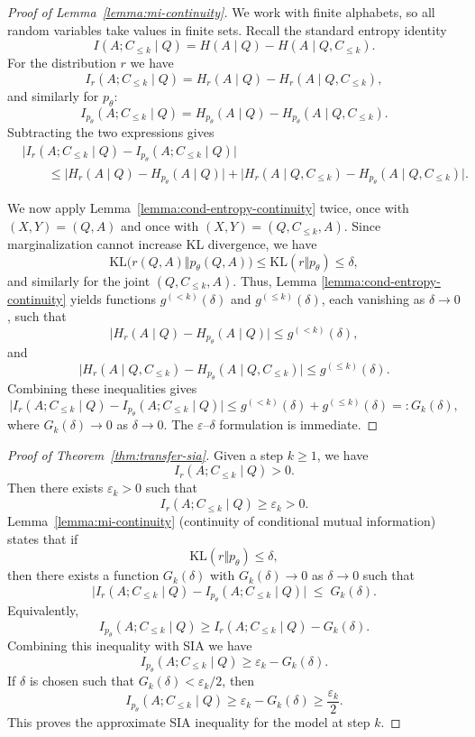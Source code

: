 \documentclass{article}
\begin{document}
\begin{proof}[Proof of Lemma~\ref{lemma:mi-continuity}]
We work with finite alphabets, so all random variables take values in finite sets. Recall the standard entropy identity
\[
I(A; C_{\le k} \mid Q)
=
H(A \mid Q)
-
H(A \mid Q, C_{\le k}).
\]
For the distribution $r$ we have
\[
I_r(A; C_{\le k} \mid Q)
=
H_r(A \mid Q)
-
H_r(A \mid Q, C_{\le k}),
\]
and similarly for $p_\theta$:
\[
I_{p_\theta}(A; C_{\le k} \mid Q)
=
H_{p_\theta}(A \mid Q)
-
H_{p_\theta}(A \mid Q, C_{\le k}).
\]
Subtracting the two expressions gives
\begin{align*}
&\bigl|
I_r(A; C_{\le k} \mid Q)
-
I_{p_\theta}(A; C_{\le k} \mid Q)
\bigr| \\
&\qquad\le
\bigl|
H_r(A \mid Q)
-
H_{p_\theta}(A \mid Q)
\bigr|
+
\bigl|
H_r(A \mid Q, C_{\le k})
-
H_{p_\theta}(A \mid Q, C_{\le k})
\bigr|.
\end{align*}

We now apply Lemma~\ref{lemma:cond-entropy-continuity} twice, once
with $(X,Y) = (Q,A)$ and once with $(X,Y) = (Q,C_{\le k},A)$. Since marginalization cannot increase KL divergence, we have
\[
\mathrm{KL}\bigl(r(Q,A)
\Vert
p_\theta(Q,A)
\bigr)
\le \mathrm{KL}(r\Vert p_\theta)
\le \delta,
\]
and similarly for the joint $(Q,C_{\le k},A)$. Thus, Lemma
\ref{lemma:cond-entropy-continuity} yields functions
$g^{(<k)}(\delta)$ and $g^{(\le k)}(\delta)$, each vanishing as
$\delta\to 0$, such that
\[
\bigl|
H_r(A \mid Q)
-
H_{p_\theta}(A \mid Q)
\bigr|
\le g^{(<k)}(\delta),
\]
and
\[
\bigl|
H_r(A \mid Q, C_{\le k})
-
H_{p_\theta}(A \mid Q, C_{\le k})
\bigr|
\le g^{(\le k)}(\delta).
\]
Combining these inequalities gives
\[
\bigl|
I_r(A; C_{\le k} \mid Q)
-
I_{p_\theta}(A; C_{\le k} \mid Q)
\bigr|
\le
g^{(<k)}(\delta) + g^{(\le k)}(\delta)
=: G_k(\delta),
\]
where $G_k(\delta)\to 0$ as $\delta\to 0$. The
$\varepsilon$--$\delta$ formulation is immediate.
\end{proof}

\begin{proof}[Proof of Theorem~\ref{thm:transfer-sia}]
Given a step $k \geq 1$, we have
\[
I_r(A; C_{\leq k} \mid Q) > 0.
\]
Then there exists $\varepsilon_k > 0$ such that
\[
I_r(A; C_{\leq k} \mid Q) \ge \varepsilon_k > 0.
\]
Lemma~\ref{lemma:mi-continuity} (continuity of conditional mutual information) states that if 
\[
\mathrm{KL}(r \Vert p_\theta) \le \delta,
\]
then there exists a function $G_k(\delta)$ with $G_k(\delta) \to 0$ as $\delta \to 0$ such that
\[
\bigl| I_r(A; C_{\le k} \mid Q) - I_{p_\theta}(A; C_{\le k} \mid Q) \bigr|
\;\le\; G_k(\delta).
\]
Equivalently,
\[
I_{p_\theta}(A; C_{\le k} \mid Q)
\ge I_r(A; C_{\le k} \mid Q) - G_k(\delta).
\]
Combining this inequality with SIA we have
\[
I_{p_\theta}(A; C_{\le k} \mid Q)
\ge \varepsilon_k - G_k(\delta).
\]
If $\delta$ is chosen such that $G_k(\delta) < \varepsilon_k/2$, then
\[
I_{p_\theta}(A; C_{\le k} \mid Q)
\ge \varepsilon_k - G_k(\delta)
\ge \frac{\varepsilon_k}{2}.
\]
This proves the approximate SIA inequality for the model at step $k$.
\end{proof}
\end{document}
